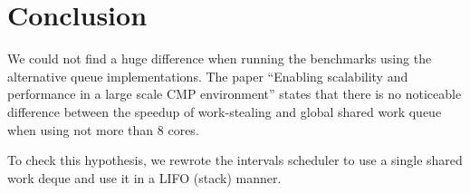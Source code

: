 
\chapter{Conclusion}
\label{chap:queues-conclusion}


We could not find a huge difference when running the benchmarks using
the alternative queue implementations. The paper ``Enabling
scalability and performance in a large scale CMP environment''
\cite{Saha2007} states that there is no noticeable difference between
the speedup of work-stealing and global shared work queue when using
not more than 8 cores.

To check this hypothesis, we rewrote the intervals scheduler to use a
single shared work deque and use it in a LIFO (stack) manner.


